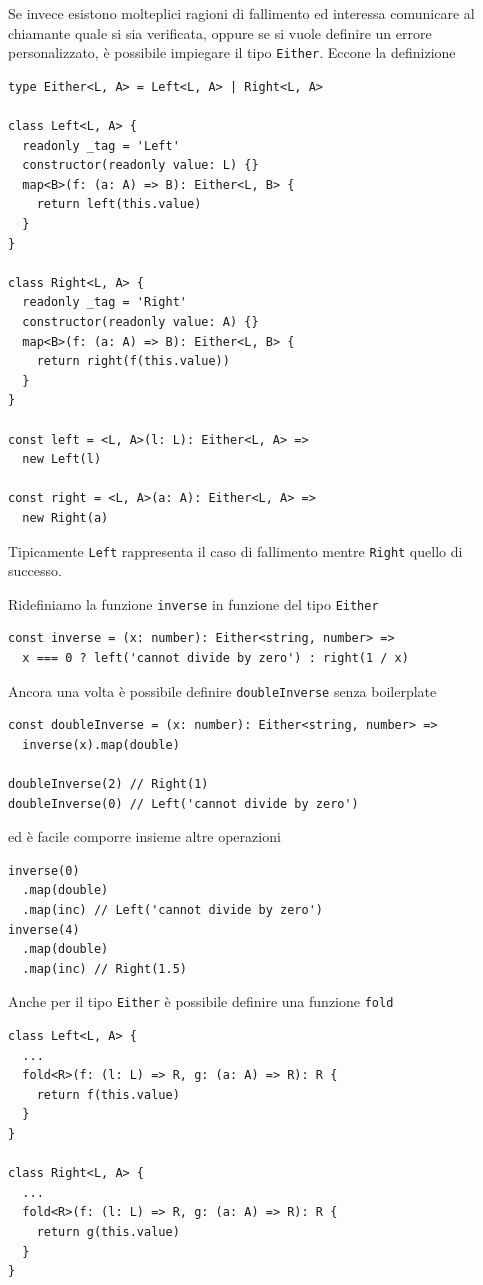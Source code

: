 \documentclass[12pt]{article}
\begin{document}
Se invece esistono molteplici ragioni di fallimento ed interessa comunicare al chiamante quale si sia verificata,
oppure se si vuole definire un errore personalizzato, è possibile impiegare il tipo \texttt{Either}. Eccone la definizione

\begin{verbatim}
type Either<L, A> = Left<L, A> | Right<L, A>

class Left<L, A> {
  readonly _tag = 'Left'
  constructor(readonly value: L) {}
  map<B>(f: (a: A) => B): Either<L, B> {
    return left(this.value)
  }
}

class Right<L, A> {
  readonly _tag = 'Right'
  constructor(readonly value: A) {}
  map<B>(f: (a: A) => B): Either<L, B> {
    return right(f(this.value))
  }
}

const left = <L, A>(l: L): Either<L, A> =>
  new Left(l)

const right = <L, A>(a: A): Either<L, A> =>
  new Right(a)
\end{verbatim}

Tipicamente \texttt{Left} rappresenta il caso di fallimento mentre \texttt{Right} quello di successo.

Ridefiniamo la funzione \texttt{inverse} in funzione del tipo \texttt{Either}

\begin{verbatim}
const inverse = (x: number): Either<string, number> =>
  x === 0 ? left('cannot divide by zero') : right(1 / x)
\end{verbatim}

Ancora una volta è possibile definire \texttt{doubleInverse} senza boilerplate

\begin{verbatim}
const doubleInverse = (x: number): Either<string, number> =>
  inverse(x).map(double)

doubleInverse(2) // Right(1)
doubleInverse(0) // Left('cannot divide by zero')
\end{verbatim}

ed è facile comporre insieme altre operazioni

\begin{verbatim}
inverse(0)
  .map(double)
  .map(inc) // Left('cannot divide by zero')
inverse(4)
  .map(double)
  .map(inc) // Right(1.5)
\end{verbatim}

Anche per il tipo \texttt{Either} è possibile definire una funzione \texttt{fold}

\begin{verbatim}
class Left<L, A> {
  ...
  fold<R>(f: (l: L) => R, g: (a: A) => R): R {
    return f(this.value)
  }
}

class Right<L, A> {
  ...
  fold<R>(f: (l: L) => R, g: (a: A) => R): R {
    return g(this.value)
  }
}
\end{verbatim}
\end{document}
